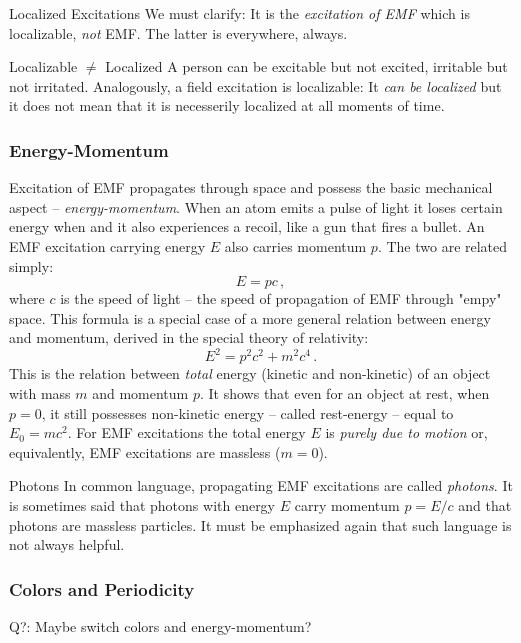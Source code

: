 \begin{myrem}{Localized Excitations}
	We must clarify: It is the \emph{excitation of EMF} which is localizable, \emph{not} EMF. The latter is everywhere, always.
\end{myrem}

\begin{myrem}{Localizable $\ne$ Localized}
	A person can be excitable but not excited, irritable but not irritated. Analogously, a field excitation is localizable: It \emph{can be localized} but it does not mean that it is necesserily localized at all moments of time.
\end{myrem}



\subsubsection*{Energy-Momentum}
Excitation of EMF propagates through space and possess the basic mechanical aspect -- \emph{energy-momentum}. When an atom emits a pulse of light it loses certain energy when and it also experiences a recoil, like a gun that fires a bullet. An EMF excitation carrying energy $E$ also carries momentum $p$. The two are related simply:
\[
E = pc\,,
\]
where $c$ is the speed of light -- the speed of propagation of EMF through "empy" space. This formula is a special case of a more general relation between energy and momentum, derived in the special theory of relativity:
\[
E^2 = p^2 c^2 + m^2c^4\,.
\]
This is the relation between \emph{total} energy (kinetic and non-kinetic) of an object with mass $m$ and momentum $p$. It shows that even for an object at rest, when $p=0$, it still possesses non-kinetic energy -- called rest-energy -- equal to $E_0=mc^2$. For EMF excitations the total energy $E$ is \emph{purely due to motion} or, equivalently, EMF excitations are massless ($m=0$).
\begin{myrem}{Photons}
	In common language, propagating EMF excitations are called \emph{photons}. It is sometimes said that photons with energy $E$ carry momentum $p=E/c$ and that photons are massless particles. It must be emphasized again that such language is not always helpful.
\end{myrem}

\subsubsection*{Colors and Periodicity}
Q?: Maybe switch colors and energy-momentum?

